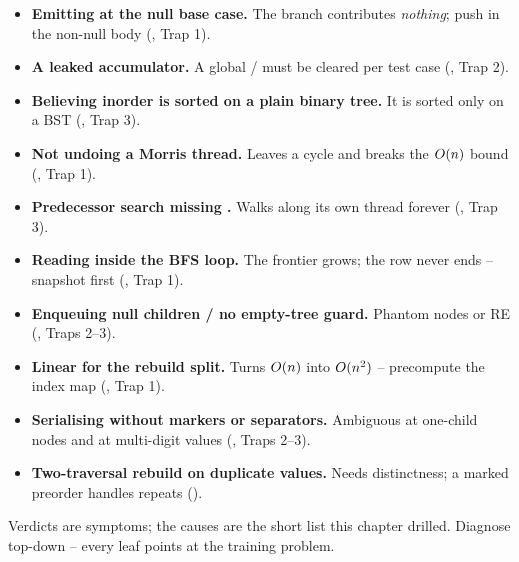 \begin{itemize}[nosep, leftmargin=1.4em]
  \item \textbf{Emitting at the null base case.} The \nil{} branch contributes
        \emph{nothing}; push in the non-null body (, Trap 1).
  \item \textbf{A leaked accumulator.} A global / must be
        cleared per test case (, Trap 2).
  \item \textbf{Believing inorder is sorted on a plain binary tree.} It is sorted only
        on a BST (, Trap 3).
  \item \textbf{Not undoing a Morris thread.} Leaves a cycle and breaks the
        $O(n)$ bound (, Trap 1).
  \item \textbf{Predecessor search missing .} Walks along its own thread
        forever (, Trap 3).
  \item \textbf{Reading  inside the BFS loop.} The frontier grows; the
        row never ends -- snapshot first (, Trap 1).
  \item \textbf{Enqueuing null children / no empty-tree guard.} Phantom nodes or RE
        (, Traps 2--3).
  \item \textbf{Linear  for the rebuild split.} Turns $O(n)$ into
        $O(n^2)$ -- precompute the index map (, Trap 1).
  \item \textbf{Serialising without markers or separators.} Ambiguous at one-child
        nodes and at multi-digit values (, Traps 2--3).
  \item \textbf{Two-traversal rebuild on duplicate values.} Needs distinctness; a
        marked preorder handles repeats ().
\end{itemize}


Verdicts are symptoms; the causes are the short list this chapter drilled. Diagnose
top-down -- every leaf points at the training problem.

